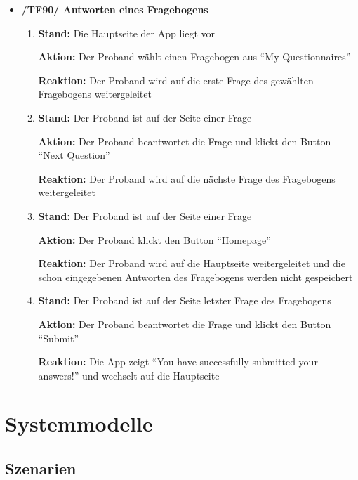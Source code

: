 \documentclass[a4paper]{scrreprt}
\begin{document}
\begin{itemize}
	        \item \textbf{/TF90/ Antworten eines Fragebogens}
	        \begin{enumerate}
	        	\item \par \textbf{Stand: }Die Hauptseite der App liegt vor
	        	\par \textbf{Aktion: }Der \gls{Proband} wählt einen Fragebogen aus ``My Questionnaires''
	        	\par \textbf{Reaktion: }Der \gls{Proband} wird auf die erste Frage des gewählten Fragebogens weitergeleitet
	        	\item \par \textbf{Stand: }Der \gls{Proband} ist auf der Seite einer Frage
	        	\par \textbf{Aktion: }Der \gls{Proband} beantwortet die Frage und klickt den Button ``Next Question''
	        	\par \textbf{Reaktion: }Der \gls{Proband} wird auf die nächste Frage des Fragebogens weitergeleitet
	        	\item \par \textbf{Stand: }Der \gls{Proband} ist auf der Seite einer Frage
	        	\par \textbf{Aktion: }Der \gls{Proband} klickt den Button ``Homepage''
	        	\par \textbf{Reaktion: }Der \gls{Proband} wird auf die Hauptseite weitergeleitet und die schon eingegebenen Antworten des Fragebogens werden nicht gespeichert
	        	\item \par \textbf{Stand: }Der \gls{Proband} ist auf der Seite letzter Frage des Fragebogens
	        	\par \textbf{Aktion: }Der \gls{Proband} beantwortet die Frage und klickt den Button ``Submit''
	        	\par \textbf{Reaktion: }Die App zeigt ``You have successfully submitted your answers!'' und wechselt auf die Hauptseite
	        \end{enumerate}

            \end{itemize}

    \chapter{Systemmodelle}

        \section{Szenarien}
\end{document}
